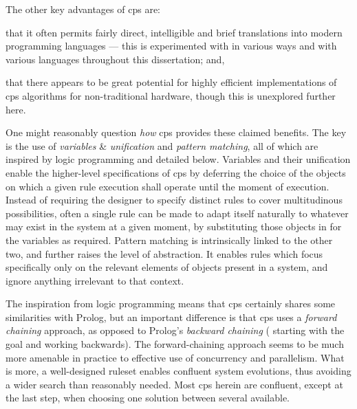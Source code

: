 The other key advantages of \gls{cps} are:
\begin{inparaenum}[a)]
\item that it often permits fairly direct, intelligible and brief translations into modern programming languages --- this is experimented with in various ways and with various languages throughout this dissertation; and,
\item that there appears to be great potential for highly efficient implementations of \gls{cps} algorithms for non-traditional hardware, though this is unexplored further here.
\end{inparaenum}

One might reasonably question \emph{how} \gls{cps} provides these claimed benefits.  The key is the use of \emph{variables} \& \emph{unification} and \emph{pattern matching}, all of which are inspired by logic programming and detailed below.  Variables and their unification enable the higher-level specifications of \gls{cps} by deferring the choice of the objects on which a given rule execution shall operate until the moment of execution.  Instead of requiring the designer to specify distinct rules to cover multitudinous possibilities, often a single rule can be made to adapt itself naturally to whatever may exist in the system at a given moment, by substituting those objects in for the variables as required.  Pattern matching is intrinsically linked to the other two, and further raises the level of abstraction.  It enables rules which focus specifically only on the relevant elements of objects present in a system, and ignore anything irrelevant to that context.

The inspiration from logic programming means that \gls{cps} certainly shares some similarities with Prolog, but an important difference is that \gls{cps} uses a \emph{forward chaining} approach, as opposed to Prolog's \emph{backward chaining} (\ie{} starting with the goal and working backwards).  The forward-chaining approach seems to be much more amenable in practice to effective use of concurrency and parallelism.  What is more, a well-designed ruleset enables confluent system evolutions, thus avoiding a wider search than reasonably needed.  Most \gls{cps} herein are confluent, except at the last step, when choosing one solution between several available.













